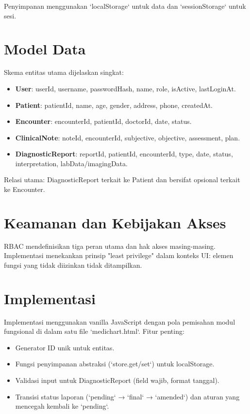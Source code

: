 \documentclass[12pt,a4paper]{article}
\begin{document}
Penyimpanan menggunakan `localStorage` untuk data dan `sessionStorage` untuk sesi.

\section{Model Data}
Skema entitas utama dijelaskan singkat:
\begin{itemize}
  \item \textbf{User}: userId, username, passwordHash, name, role, isActive, lastLoginAt.
  \item \textbf{Patient}: patientId, name, age, gender, address, phone, createdAt.
  \item \textbf{Encounter}: encounterId, patientId, doctorId, date, status.
  \item \textbf{ClinicalNote}: noteId, encounterId, subjective, objective, assessment, plan.
  \item \textbf{DiagnosticReport}: reportId, patientId, encounterId, type, date, status, interpretation, labData/imagingData.
\end{itemize}

Relasi utama: DiagnosticReport terkait ke Patient dan bersifat opsional terkait ke Encounter.

\section{Keamanan dan Kebijakan Akses}
RBAC mendefinisikan tiga peran utama dan hak akses masing-masing. Implementasi menekankan prinsip "least privilege" dalam konteks UI: elemen fungsi yang tidak diizinkan tidak ditampilkan.

\section{Implementasi}
Implementasi menggunakan vanilla JavaScript dengan pola pemisahan modul fungsional di dalam satu file `medichart.html`. Fitur penting:
\begin{itemize}
  \item Generator ID unik untuk entitas.
  \item Fungsi penyimpanan abstraksi (`store.get/set`) untuk localStorage.
  \item Validasi input untuk DiagnosticReport (field wajib, format tanggal).
  \item Transisi status laporan (`pending` → `final` → `amended`) dan aturan yang mencegah kembali ke `pending`.
\end{itemize}
\end{document}
